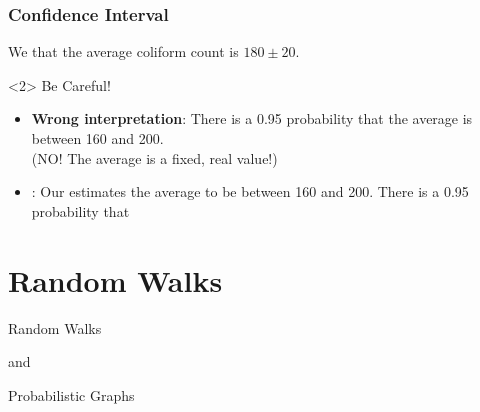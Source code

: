 \documentclass{beamer}
\begin{document}
\begin{frame}
  \frametitle{Confidence Interval}

  {\large


  \bigskip
  
  We  that the average
  coliform count is $180\pm20$.

  \bigskip

  \begin{onlyenv}<2>
  Be Careful!
  \begin{itemize}
  \item \alert{{\bf Wrong interpretation}}: There is a 0.95 probability
    that the average is between 160 and 200.\\
    \hfill (NO! The average is a fixed, real value!)

    \bigskip

  \item {}: Our
     estimates the average to be between
    160 and 200. There is a 0.95 probability that 
    
  \end{itemize}
  \end{onlyenv}

  }
\end{frame}



\section{Random Walks}
\begin{frame}
  \begin{centering}
    {\huge Random Walks}\\
    \bigskip

    and\\
    \bigskip

    {\huge Probabilistic Graphs}
    
  \end{centering}
\end{frame}
\end{document}
